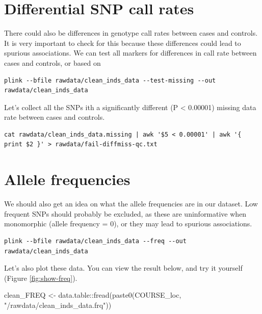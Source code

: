 \documentclass[
]{book}
\newenvironment{Shaded}{\begin{snugshade}}{\end{snugshade}}
\newcommand{\FunctionTok}[1]{\textcolor[rgb]{0.00,0.00,0.00}{#1}}
\newcommand{\NormalTok}[1]{#1}
\newcommand{\OtherTok}[1]{\textcolor[rgb]{0.56,0.35,0.01}{#1}}
\newcommand{\SpecialCharTok}[1]{\textcolor[rgb]{0.00,0.00,0.00}{#1}}
\newcommand{\StringTok}[1]{\textcolor[rgb]{0.31,0.60,0.02}{#1}}
\begin{document}
\hypertarget{differential-snp-call-rates}{%
\section{Differential SNP call rates}\label{differential-snp-call-rates}}

There could also be differences in genotype call rates between cases and controls. It is very important to check for this because these differences could lead to spurious associations. We can test all markers for differences in call rate between cases and controls, or based on

\begin{verbatim}
plink --bfile rawdata/clean_inds_data --test-missing --out rawdata/clean_inds_data
\end{verbatim}

Let's collect all the SNPs ith a significantly different (P \textless{} 0.00001) missing data rate between cases and controls.

\begin{verbatim}
cat rawdata/clean_inds_data.missing | awk '$5 < 0.00001' | awk '{ print $2 }' > rawdata/fail-diffmiss-qc.txt
\end{verbatim}

\hypertarget{allele-frequencies}{%
\section{Allele frequencies}\label{allele-frequencies}}

We should also get an idea on what the allele frequencies are in our dataset. Low frequent SNPs should probably be excluded, as these are uninformative when monomorphic (allele frequency = 0), or they may lead to spurious associations.

\begin{verbatim}
plink --bfile rawdata/clean_inds_data --freq --out rawdata/clean_inds_data
\end{verbatim}

Let's also plot these data. You can view the result below, and try it yourself (Figure \ref{fig:show-freq}).

\begin{Shaded}
\begin{Highlighting}[]
\NormalTok{clean\_FREQ }\OtherTok{\textless{}{-}}\NormalTok{ data.table}\SpecialCharTok{::}\FunctionTok{fread}\NormalTok{(}\FunctionTok{paste0}\NormalTok{(COURSE\_loc, }\StringTok{"/rawdata/clean\_inds\_data.frq"}\NormalTok{))}
\end{Highlighting}
\end{Shaded}
\end{document}
